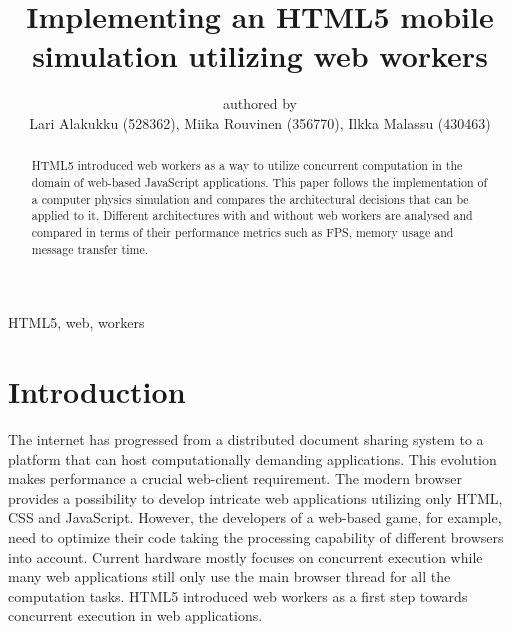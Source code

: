 \documentclass[conference]{IEEEtran}
\begin{document}
\title{Implementing an HTML5 mobile simulation utilizing web workers}

\author{authored by\\
        Lari Alakukku (528362),
        Miika Rouvinen (356770),
        Ilkka Malassu (430463)}%

\makeatletter         
\def\@maketitle{
\begin{center}
{\Huge \bfseries \sffamily \@title }\\[4ex] 
Submitted on \@date\\
{\normalsize \@author}\\[4ex] 
\end{center}}
\makeatother


\maketitle

\begin{IEEEkeywords}
HTML5, web, workers
\end{IEEEkeywords}

\begin{abstract}

HTML5 introduced web workers as a way to utilize concurrent computation in the domain of web-based JavaScript applications. This paper follows the implementation
of a computer physics simulation and compares the architectural decisions that can be applied to it. Different architectures with and without web workers are
analysed and compared in terms of their performance metrics such as FPS, memory usage and message transfer time.
 
\end{abstract}

\section{Introduction}
\label{chap:introduction}

The internet has progressed from a distributed document sharing system to a platform that can host computationally demanding applications. This evolution makes performance a crucial web-client requirement. The modern browser provides a possibility to develop intricate web applications utilizing only HTML, CSS and JavaScript. However, the developers of a web-based game, for example, need to optimize their code taking the processing capability of different browsers into account. Current hardware mostly focuses on concurrent execution while many web applications still only use the main browser thread for all the computation tasks. HTML5 introduced web workers as a first step towards concurrent execution in web applications. \cite{doha}
\end{document}
